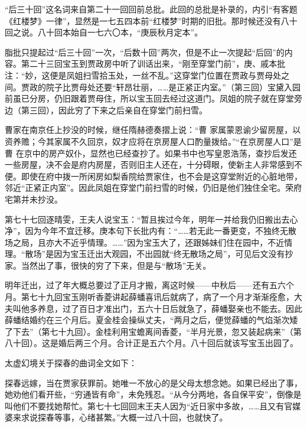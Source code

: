 \par “后三十回”这名词来自第二十一回回前总批。此回的总批是补录的，内引“有客题《红楼梦》一律”，显然是一七五四本前“红楼梦”时期的旧批。那时候还没有八十回之说。八十回本始自一七六〇本，“庚辰秋月定本”。
\par 脂批只提起过“后三十回”一次，“后数十回”两次，但是不止一次提起“后回”的内容。第二十三回宝玉到贾政房中听了训话出来，“刚至穿堂门前”，庚、戚本批注：“妙，这便是凤姐扫雪拾玉处，一丝不乱。”这穿堂门位置在贾政与贾母处之间。贾政的院子比贾母处还要“轩昂壮丽，……是正紧正内室。”（第三回）宝黛入园前虽已分房，仍旧跟着贾母住，所以宝玉回去经过这道门。凤姐的院子就在穿堂旁边（第三回），因此穷了下来之后亲自在穿堂门前扫雪。
\par 曹家在南京任上抄没的时候，继任隋赫德奏摺上说：“曹 家属蒙恩谕少留房屋，以资养赡；今其家属不久回京，奴才应将在京房屋人口酌量拨给。”“在京房屋人口”是曹 在京中的房产奴仆，显然也已经查抄了。如果书中也写皇恩浩荡，查抄后发还一些房屋，决不会是府内房屋，否则旧主人还在，十分碍眼，使新主人非常感到不便。即使在府中拨一所闲房如梨香院给贾家住，也不会是这穿堂附近的心脏地带，邻近“正紧正内室”。因此凤姐在穿堂门前扫雪的时候，仍旧是他们独住全宅。荣府宅第并未抄没。
\par 第七十七回逐晴雯，王夫人说宝玉：“暂且挨过今年，明年一并给我仍旧搬出去心净”，因为今年不宜迁移。庚本句下长批内有：“……若无此一番更变，不独终无散场之局，且亦大不近乎情理。……”因为宝玉大了，还跟姊妹们住在园中，不近情理。“散场”是因为宝玉迁出大观园，不出园就“终无散场之局”，可见后文没有抄家。当然出了事，很快的穷了下来，但是与“散场”无关。
\par 明年迁出，过了年大概总要过了正月才搬，离这时候——中秋后——还有五六个月。第七十九回宝玉刚听香菱讲起薛蟠喜讯后就病了，病了一个月才渐渐痊愈，大夫叫他多养息，过了百日才准出门，五六十日后就急了，薛蟠娶亲也不能去。因此薛蟠结婚约在三个月后。夏金桂会操纵丈夫，“两月之后，便觉薛蟠的气焰渐次矮了下去”（第七十九回）。金桂利用宝蟾离间香菱，“半月光景，忽又装起病来”（第八十回）。这是婚后两三个月。合计正是五六个月。八十回后就该写宝玉出园了。
\par 太虚幻境关于探春的曲词全文如下：
\par 探春远嫁，当在贾家获罪前。她唯一不放心的是父母太想念她。如果已经出了事，她劝他们看开些，“穷通皆有命”，未免残忍。“从今分两地，各自保平安”，倒像是叫他们不要找她帮忙。第七十七回回末王夫人因为“近日家中多故，……且又有官媒婆来求说探春等事，心绪甚繁。”大概一过八十回，也就快了。
